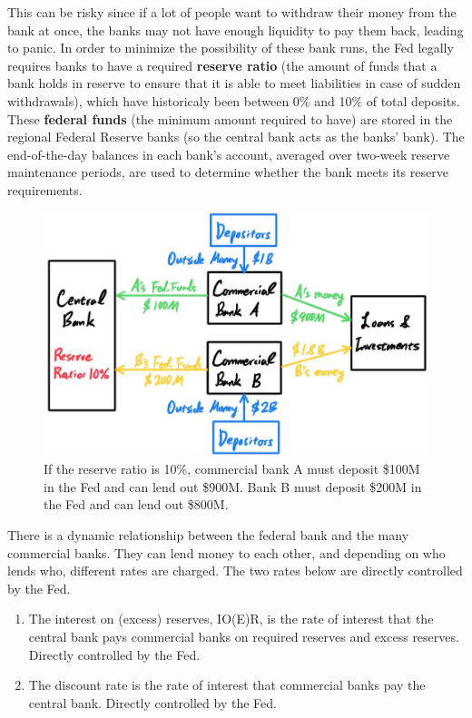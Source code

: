 \documentclass{article}
\begin{document}
    This can be risky since if a lot of people want to withdraw their money from the bank at once, the banks may not have enough liquidity to pay them back, leading to panic. In order to minimize the possibility of these bank runs, the Fed legally requires banks to have a required \textbf{reserve ratio} (the amount of funds that a bank holds in reserve to ensure that it is able to meet liabilities in case of sudden withdrawals), which have historicaly been between 0\% and 10\% of total deposits. These \textbf{federal funds} (the minimum amount required to have) are stored in the regional Federal Reserve banks (so the central bank acts as the banks' bank). The end-of-the-day balances in each bank's account, averaged over two-week reserve maintenance periods, are used to determine whether the bank meets its reserve requirements. 

    \begin{figure}[H]
      \centering 
      \includegraphics[scale=0.3]{img/Fed_Funds_Rate.jpg}
      \caption{If the reserve ratio is 10\%, commercial bank A must deposit \$100M in the Fed and can lend out \$900M. Bank B must deposit \$200M in the Fed and can lend out \$800M. } 
      \label{fig:Fed_Funds_Rate}
    \end{figure}

    \begin{definition}
      There is a dynamic relationship between the federal bank and the many commercial banks. They can lend money to each other, and depending on who lends who, different rates are charged. The two rates below are directly controlled by the Fed.
      \begin{enumerate}
        \item The interest on (excess) reserves, IO(E)R, is the rate of interest that the central bank pays commercial banks on required reserves and excess reserves. Directly controlled by the Fed.
        \item The discount rate is the rate of interest that commercial banks pay the central bank. Directly controlled by the Fed.
      \end{enumerate}
    \end{definition}
\end{document}
